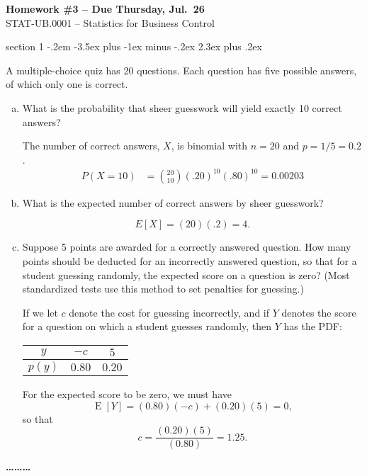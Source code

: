 \documentclass[answers,11pt]{exam}
\makeatletter
\DeclareMathOperator*{\E}{E}
\newenvironment{problem}{\@startsection
       {section}
       {1}
       {-.2em}
       {-3.5ex plus -1ex minus -.2ex}
       {2.3ex plus .2ex}
       {\pagebreak[3]%
       \large\bf\noindent{Problem }
       }
       }
       {%
       \begin{center}\large\bf \ldots\ldots\ldots\end{center}}
\makeatother
\begin{document}
\begin{center}
  \large
  \textbf{Homework \#3 -- Due Thursday, Jul.~26} \\
  STAT-UB.0001 -- Statistics for Business Control \\
\end{center}


\thispagestyle{empty}

\begin{problem}{}

A multiple-choice quiz has 20 questions. Each question has five possible
answers, of which only one is correct.

\begin{enumerate}[(a)]

\item What is the probability that sheer guesswork will yield exactly 10 correct answers?
\begin{solution}
The number of correct answers, $X$, is binomial with $n = 20$ and $p = 1/5 =0.2$.
\begin{align*}
P(X = 10)
   &=  \binom{20}{10} (.20)^{10} (.80)^{10} = 0.00203
\end{align*}


\end{solution}

\item What is the expected number of correct answers by sheer guesswork?

\begin{solution}
\[
  E[X] = (20) (.2) = 4.
\]
\end{solution}

\item Suppose 5 points are awarded for a correctly answered question. How many
points should be deducted for an incorrectly answered question, so that for a
student guessing randomly, the expected score on a question is zero? (Most
standardized tests use this method to set penalties for guessing.)
\begin{solution}
If we let $c$ denote the cost for guessing incorrectly, and if $Y$ denotes the
score for a question on which a student guesses randomly, then $Y$
has the PDF:
\begin{center}
\begin{tabular}{c|cc}
$y$    & $-c$   & $5$ \\
\hline
$p(y)$ & $0.80$ & $0.20$
\end{tabular}
\end{center}
For the expected score to be zero, we must have
\[
  \E[Y] = (0.80)(-c) + (0.20)(5) = 0,
\]
so that
\[
    c = \frac{(0.20)(5)}{(0.80)}
      = 1.25.
\]


\end{solution}
\end{enumerate}
\end{problem}
\end{document}
